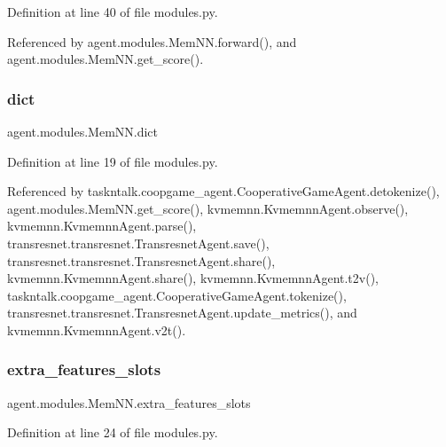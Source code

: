 Definition at line 40 of file modules.\+py.



Referenced by agent.\+modules.\+Mem\+N\+N.\+forward(), and agent.\+modules.\+Mem\+N\+N.\+get\+\_\+score().

\mbox{\label{classagent_1_1modules_1_1MemNN_a141cdf0a3d28af1cfc47b9990abc74c6}} 
\subsubsection{\texorpdfstring{dict}{dict}}
{\footnotesize\ttfamily agent.\+modules.\+Mem\+N\+N.\+dict}



Definition at line 19 of file modules.\+py.



Referenced by taskntalk.\+coopgame\+\_\+agent.\+Cooperative\+Game\+Agent.\+detokenize(), agent.\+modules.\+Mem\+N\+N.\+get\+\_\+score(), kvmemnn.\+Kvmemnn\+Agent.\+observe(), kvmemnn.\+Kvmemnn\+Agent.\+parse(), transresnet.\+transresnet.\+Transresnet\+Agent.\+save(), transresnet.\+transresnet.\+Transresnet\+Agent.\+share(), kvmemnn.\+Kvmemnn\+Agent.\+share(), kvmemnn.\+Kvmemnn\+Agent.\+t2v(), taskntalk.\+coopgame\+\_\+agent.\+Cooperative\+Game\+Agent.\+tokenize(), transresnet.\+transresnet.\+Transresnet\+Agent.\+update\+\_\+metrics(), and kvmemnn.\+Kvmemnn\+Agent.\+v2t().

\mbox{\label{classagent_1_1modules_1_1MemNN_a3fe1dbdb20b36d425585aa5ede13acf9}} 
\subsubsection{\texorpdfstring{extra\+\_\+features\+\_\+slots}{extra\_features\_slots}}
{\footnotesize\ttfamily agent.\+modules.\+Mem\+N\+N.\+extra\+\_\+features\+\_\+slots}



Definition at line 24 of file modules.\+py.



